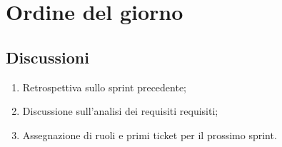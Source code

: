 \section{Ordine del giorno} \label{sec:agenda}
\subsection{Discussioni} \label{subsec:discussione}
\begin{enumerate}
    \item Retrospettiva sullo sprint precedente;
    \item Discussione sull'analisi dei requisiti requisiti;
    \item Assegnazione di ruoli e primi ticket per il prossimo sprint.
\end{enumerate}
